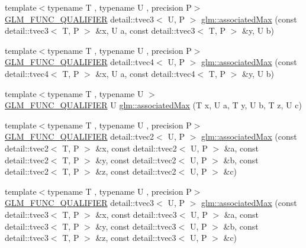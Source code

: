 \begin{DoxyCompactItemize}
\item 
{\footnotesize template$<$typename T , typename U , precision P$>$ }\\\hyperlink{setup_8hpp_a33fdea6f91c5f834105f7415e2a64407}{G\+L\+M\+\_\+\+F\+U\+N\+C\+\_\+\+Q\+U\+A\+L\+I\+F\+I\+ER} detail\+::tvec3$<$ U, P $>$ \hyperlink{namespaceglm_a40f7f83f46b9e3af8159d06639cc9f9f}{glm\+::associated\+Max} (const detail\+::tvec3$<$ T, P $>$ \&x, U a, const detail\+::tvec3$<$ T, P $>$ \&y, U b)
\item 
{\footnotesize template$<$typename T , typename U , precision P$>$ }\\\hyperlink{setup_8hpp_a33fdea6f91c5f834105f7415e2a64407}{G\+L\+M\+\_\+\+F\+U\+N\+C\+\_\+\+Q\+U\+A\+L\+I\+F\+I\+ER} detail\+::tvec4$<$ U, P $>$ \hyperlink{namespaceglm_afe37630c8b8738b686795f3540e18433}{glm\+::associated\+Max} (const detail\+::tvec4$<$ T, P $>$ \&x, U a, const detail\+::tvec4$<$ T, P $>$ \&y, U b)
\item 
{\footnotesize template$<$typename T , typename U $>$ }\\\hyperlink{setup_8hpp_a33fdea6f91c5f834105f7415e2a64407}{G\+L\+M\+\_\+\+F\+U\+N\+C\+\_\+\+Q\+U\+A\+L\+I\+F\+I\+ER} U \hyperlink{namespaceglm_a05414bdce7cb412a7417e04afe225095}{glm\+::associated\+Max} (T x, U a, T y, U b, T z, U c)
\item 
{\footnotesize template$<$typename T , typename U , precision P$>$ }\\\hyperlink{setup_8hpp_a33fdea6f91c5f834105f7415e2a64407}{G\+L\+M\+\_\+\+F\+U\+N\+C\+\_\+\+Q\+U\+A\+L\+I\+F\+I\+ER} detail\+::tvec2$<$ U, P $>$ \hyperlink{namespaceglm_a69390fa2f28e98f8a9f8186d8197dc27}{glm\+::associated\+Max} (const detail\+::tvec2$<$ T, P $>$ \&x, const detail\+::tvec2$<$ U, P $>$ \&a, const detail\+::tvec2$<$ T, P $>$ \&y, const detail\+::tvec2$<$ U, P $>$ \&b, const detail\+::tvec2$<$ T, P $>$ \&z, const detail\+::tvec2$<$ U, P $>$ \&c)
\item 
{\footnotesize template$<$typename T , typename U , precision P$>$ }\\\hyperlink{setup_8hpp_a33fdea6f91c5f834105f7415e2a64407}{G\+L\+M\+\_\+\+F\+U\+N\+C\+\_\+\+Q\+U\+A\+L\+I\+F\+I\+ER} detail\+::tvec3$<$ U, P $>$ \hyperlink{namespaceglm_af82b37be75e0c5604427cd0f2520cd5a}{glm\+::associated\+Max} (const detail\+::tvec3$<$ T, P $>$ \&x, const detail\+::tvec3$<$ U, P $>$ \&a, const detail\+::tvec3$<$ T, P $>$ \&y, const detail\+::tvec3$<$ U, P $>$ \&b, const detail\+::tvec3$<$ T, P $>$ \&z, const detail\+::tvec3$<$ U, P $>$ \&c)
\item 

\end{DoxyCompactItemize}
